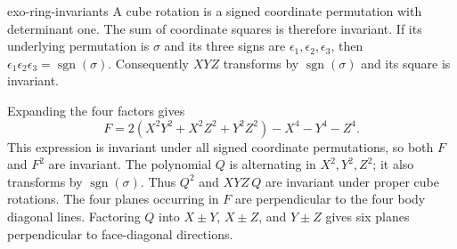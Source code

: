 \begin{correction}{exo-ring-invariants}
A cube rotation is a signed coordinate permutation with determinant
one. The sum of coordinate squares is therefore invariant. If its
underlying permutation is $\sigma$ and its three signs are
$\epsilon_1,\epsilon_2,\epsilon_3$, then
$\epsilon_1\epsilon_2\epsilon_3=\operatorname{sgn}(\sigma)$.
Consequently $XYZ$ transforms by $\operatorname{sgn}(\sigma)$ and
its square is invariant.

Expanding the four factors gives
\[
 F=2(X^2Y^2+X^2Z^2+Y^2Z^2)-X^4-Y^4-Z^4.
\]
This expression is invariant under all signed coordinate permutations,
so both $F$ and $F^2$ are invariant. The polynomial $Q$ is alternating
in $X^2,Y^2,Z^2$; it also transforms by $\operatorname{sgn}(\sigma)$.
Thus $Q^2$ and $XYZ\,Q$ are invariant under proper cube rotations.
The four planes occurring in $F$ are perpendicular to the four body
diagonal lines. Factoring $Q$ into $X\pm Y$, $X\pm Z$, and $Y\pm Z$
gives six planes perpendicular to face-diagonal directions.
\end{correction}

